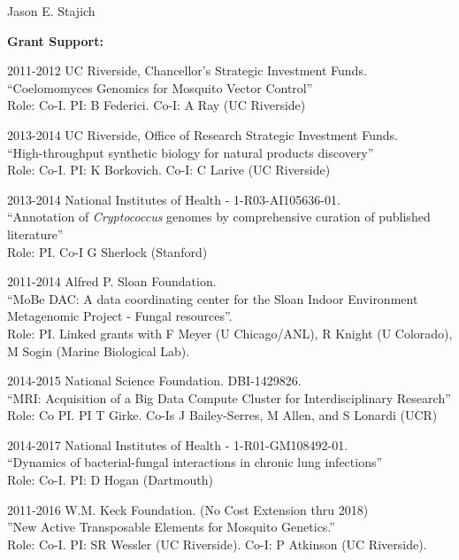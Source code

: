 \documentclass[10pt]{article}
\begin{document}
\begin{cv}{\centerline{Jason E. Stajich}}
\begin{cvlistcompact}{\bf Grant Support:}
\item [2011-2012] UC Riverside, Chancellor's Strategic Investment
  Funds. \\
``Coelomomyces Genomics for Mosquito Vector Control'' \\
Role: Co-I. PI: B Federici. Co-I: A Ray (UC Riverside)

\item [2013-2014] UC Riverside, Office of Research Strategic Investment
  Funds. \\
``High-throughput synthetic biology for natural products discovery'' \\
Role: Co-I. PI: K Borkovich. Co-I: C Larive (UC Riverside)

\item [2013-2014] National Institutes of Health - 1-R03-AI105636-01. \\
``Annotation of \textit{Cryptococcus} genomes by comprehensive
  curation of published literature'' \\
Role: PI. Co-I G Sherlock (Stanford)

  \item [2011-2014] Alfred P. Sloan Foundation. \\
``MoBe DAC: A data coordinating center for the Sloan Indoor
Environment Metagenomic Project - Fungal resources''. \\
Role: PI.  Linked grants with F Meyer (U Chicago/ANL), R Knight (U Colorado), M Sogin (Marine Biological Lab).

\item [2014-2015] National Science Foundation. DBI-1429826. \\
``MRI: Acquisition of a Big Data Compute Cluster for Interdisciplinary
  Research''
Role: Co PI. PI T Girke. Co-Is J Bailey-Serres, M Allen, and S Lonardi (UCR)

\item [2014-2017] National Institutes of Health - 1-R01-GM108492-01. \\
``Dynamics of bacterial-fungal interactions in chronic lung infections'' \\
  Role: Co-I. PI: D Hogan (Dartmouth)

  \item [2011-2016] W.M. Keck Foundation. (No Cost Extension thru 2018) \\
''New Active Transposable Elements for Mosquito Genetics.'' \\
Role: Co-I. PI: SR Wessler (UC Riverside). Co-I: P Atkinson (UC Riverside).


\end{cvlistcompact}
\end{cv}
\end{document}
